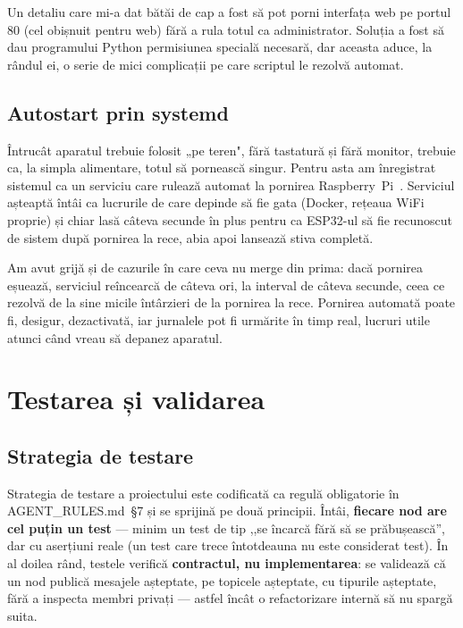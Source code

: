 \documentclass[a4paper,12pt,twoside,openany]{report}
\renewcommand{\texttt}[1]{\textnormal{#1}}
\begin{document}
Un detaliu care mi-a dat bătăi de cap a fost să pot porni interfața web pe
portul 80 (cel obișnuit pentru web) fără a rula totul ca administrator. Soluția
a fost să dau programului Python permisiunea specială necesară, dar aceasta
aduce, la rândul ei, o serie de mici complicații pe care scriptul le rezolvă
automat.

\section{Autostart prin systemd}
\label{sec:systemd}

Întrucât aparatul trebuie folosit „pe teren", fără tastatură și fără monitor,
trebuie ca, la simpla alimentare, totul să pornească singur. Pentru asta am
înregistrat sistemul ca un serviciu care rulează automat la pornirea
Raspberry~Pi~\cite{systemd}. Serviciul așteaptă întâi ca lucrurile de care
depinde să fie gata (Docker, rețeaua WiFi proprie) și chiar lasă câteva
secunde în plus pentru ca ESP32-ul să fie recunoscut de sistem după pornirea
la rece, abia apoi lansează stiva completă.

Am avut grijă și de cazurile în care ceva nu merge din prima: dacă pornirea
eșuează, serviciul reîncearcă de câteva ori, la interval de câteva secunde,
ceea ce rezolvă de la sine micile întârzieri de la pornirea la rece. Pornirea
automată poate fi, desigur, dezactivată, iar jurnalele pot fi urmărite în timp
real, lucruri utile atunci când vreau să depanez aparatul.

\clearpage

\chapter{Testarea și validarea}
\label{cap:test}

\section{Strategia de testare}
\label{sec:test-strat}

Strategia de testare a proiectului este codificată ca regulă obligatorie
în \texttt{AGENT\_RULES.md}~§7 și se sprijină pe două principii. Întâi,
\textbf{fiecare nod are cel puțin un test} --- minim un test de tip
,,se încarcă fără să se prăbușească'', dar cu aserțiuni reale (un test care
trece întotdeauna nu este considerat test). În al doilea rând, testele
verifică \textbf{contractul, nu implementarea}: se validează că un nod
publică mesajele așteptate, pe topicele așteptate, cu tipurile așteptate,
fără a inspecta membri privați --- astfel încât o refactorizare internă să
nu spargă suita.
\end{document}
